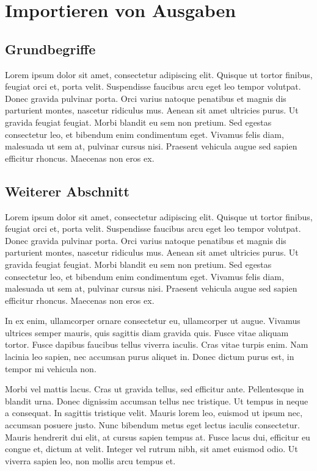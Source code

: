 \chapter{Importieren von Ausgaben}

\section{Grundbegriffe}

Lorem ipsum dolor sit amet, consectetur adipiscing elit. Quisque ut tortor finibus, feugiat orci et, porta velit. Suspendisse faucibus arcu eget leo tempor volutpat. Donec gravida pulvinar porta. Orci varius natoque penatibus et magnis dis parturient montes, nascetur ridiculus mus. Aenean sit amet ultricies purus. Ut gravida feugiat feugiat. Morbi blandit eu sem non pretium. Sed egestas consectetur leo, et bibendum enim condimentum eget. Vivamus felis diam, malesuada ut sem at, pulvinar cursus nisi. Praesent vehicula augue sed sapien efficitur rhoncus. Maecenas non eros ex. 

\section{Weiterer Abschnitt}

Lorem ipsum dolor sit amet, consectetur adipiscing elit. Quisque ut tortor finibus, feugiat orci et, porta velit. Suspendisse faucibus arcu eget leo tempor volutpat. Donec gravida pulvinar porta. Orci varius natoque penatibus et magnis dis parturient montes, nascetur ridiculus mus. Aenean sit amet ultricies purus. Ut gravida feugiat feugiat. Morbi blandit eu sem non pretium. Sed egestas consectetur leo, et bibendum enim condimentum eget. Vivamus felis diam, malesuada ut sem at, pulvinar cursus nisi. Praesent vehicula augue sed sapien efficitur rhoncus. Maecenas non eros ex.

In ex enim, ullamcorper ornare consectetur eu, ullamcorper ut augue. Vivamus ultrices semper mauris, quis sagittis diam gravida quis. Fusce vitae aliquam tortor. Fusce dapibus faucibus tellus viverra iaculis. Cras vitae turpis enim. Nam lacinia leo sapien, nec accumsan purus aliquet in. Donec dictum purus est, in tempor mi vehicula non.

Morbi vel mattis lacus. Cras ut gravida tellus, sed efficitur ante. Pellentesque in blandit urna. Donec dignissim accumsan tellus nec tristique. Ut tempus in neque a consequat. In sagittis tristique velit. Mauris lorem leo, euismod ut ipsum nec, accumsan posuere justo. Nunc bibendum metus eget lectus iaculis consectetur. Mauris hendrerit dui elit, at cursus sapien tempus at. Fusce lacus dui, efficitur eu congue et, dictum at velit. Integer vel rutrum nibh, sit amet euismod odio. Ut viverra sapien leo, non mollis arcu tempus et.
